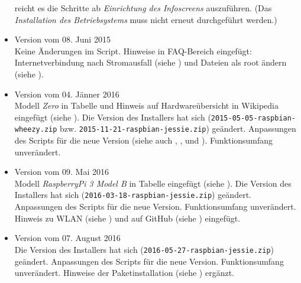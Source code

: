 \begin{itemize}
{		reicht es die Schritte ab  \textit{Einrichtung des Infoscreens} auszuführen.
		(Das  \textit{Installation des Betriebsystems} muss nicht erneut durchgeführt werden.)
		}
	\item {Version vom 08. Juni 2015\\ Keine Änderungen im Script.
		Hinweise in FAQ-Bereich eingefügt: Internetverbindung nach Stromausfall (siehe ) und Dateien als root ändern (siehe ).
 		}
	\item {Version vom 04. Jänner 2016\\ 
		Modell \textit{Zero} in Tabelle und Hinweis auf Hardwareübersicht in Wikipedia eingefügt (siehe ).
		Die Version des Installers hat sich (\lstinline|2015-05-05-raspbian-wheezy.zip| bzw. \lstinline|2015-11-21-raspbian-jessie.zip|) geändert. 
		Anpassungen des Scripts für die neue Version (siehe auch , ,  und ).
		Funktionsumfang unverändert.
 		}
	\item {Version vom 09. Mai 2016\\ 
		Modell \textit{RaspberryPi 3 Model B} in Tabelle eingefügt (siehe ).
		Die Version des Installers hat sich (\lstinline|2016-03-18-raspbian-jessie.zip|) geändert. 
		Anpassungen des Scripts für die neue Version.
		Funktionsumfang unverändert.
		Hinweis zu WLAN (siehe ) und auf GitHub (siehe ) eingefügt.
 		}
	\item {Version vom 07. August 2016\\ 
		Die Version des Installers hat sich (\lstinline|2016-05-27-raspbian-jessie.zip|) geändert. 
		Anpassungen des Scripts für die neue Version.
		Funktionsumfang unverändert.
		Hinweise der Paketinstallation (siehe ) ergänzt.
 		}
\end{itemize}

